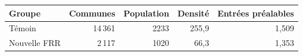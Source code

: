 \begin{tabularx}{\linewidth}{Xrrrr}
\toprule
Groupe & Communes & Population & Densité & Entrées préalables \\
\midrule
Témoin & 14\,361 & 2233 & 255,9 & 1,509 \\
Nouvelle FRR & 2\,117 & 1020 & 66,3 & 1,353 \\
\bottomrule
\end{tabularx}
